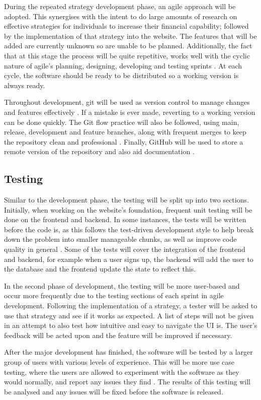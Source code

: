 During the repeated strategy development phase, an agile approach will be adopted. This synergises with the intent to do large amounts of research on effective strategies for individuals to increase their financial capability; followed by the implementation of that strategy into the website. The features that will be added are currently unknown so are unable to be planned. Additionally, the fact that at this stage the process will be quite repetitive, works well with the cyclic nature of agile's planning, designing, developing and testing sprints \cite{WaterfallVsAgile}. At each cycle, the software should be ready to be distributed so a working version is always ready.

Throughout development, git will be used as version control to manage changes and features effectively \cite{Git}. If a mistake is ever made, reverting to a working version can be done quickly. The Git flow practice will also be followed, using main, release, development and feature branches, along with frequent merges to keep the repository clean and professional \cite{GitFlow}. Finally, GitHub will be used to store a remote version of the repository and also aid documentation \cite{GitHub}.

\subsection{Testing}
Similar to the development phase, the testing will be split up into two sections. Initially, when working on the website's foundation, frequent unit testing will be done on the frontend and backend. In some instances, the tests will be written before the code is, as this follows the test-driven development style to help break down the problem into smaller manageable chunks, as well as improve code quality in general \cite{TDD}. Some of the tests will cover the integration of the frontend and backend, for example when a user signs up, the backend will add the user to the database and the frontend update the state to reflect this.

In the second phase of development, the testing will be more user-based and occur more frequently due to the testing sections of each sprint in agile development. Following the implementation of a strategy, a tester will be asked to use that strategy and see if it works as expected. A list of steps will not be given in an attempt to also test how intuitive and easy to navigate the UI is. The user's feedback will be acted upon and the feature will be improved if necessary.

After the major development has finished, the software will be tested by a larger group of users with various levels of experience. This will be more use case testing, where the users are allowed to experiment with the software as they would normally, and report any issues they find \cite{UseCaseTesting}. The results of this testing will be analysed and any issues will be fixed before the software is released.